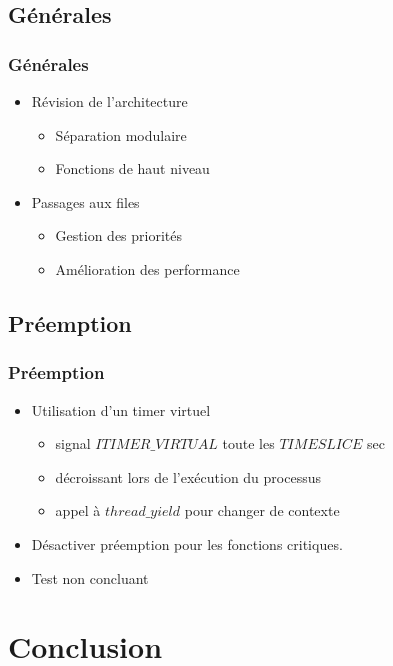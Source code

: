 \documentclass{beamer}
\begin{document}
\subsection{Générales}

\begin{frame}
	\frametitle{Générales}
	
	\begin{itemize}
		\item Révision de l'architecture
		\begin{itemize}
			\item Séparation modulaire
			\item Fonctions de haut niveau
		\end{itemize}
		\item Passages aux files
		\begin{itemize}
			\item Gestion des priorités
			\item Amélioration des performance
		\end{itemize}
	
	\end{itemize}
\end{frame}

\subsection{Préemption}

\begin{frame}
  \frametitle{Préemption}
  \begin{itemize}
    \item Utilisation d'un timer virtuel
      \begin{itemize}
      \item signal $ITIMER\_VIRTUAL$ toute les $TIMESLICE$ sec
      \item décroissant lors de l'exécution du processus
      \item appel à $thread\_yield$ pour changer de contexte
      \end{itemize}
    \item Désactiver préemption pour les fonctions critiques.
    \item Test non concluant
  \end{itemize}
\end{frame}

\section{Conclusion}
\end{document}
